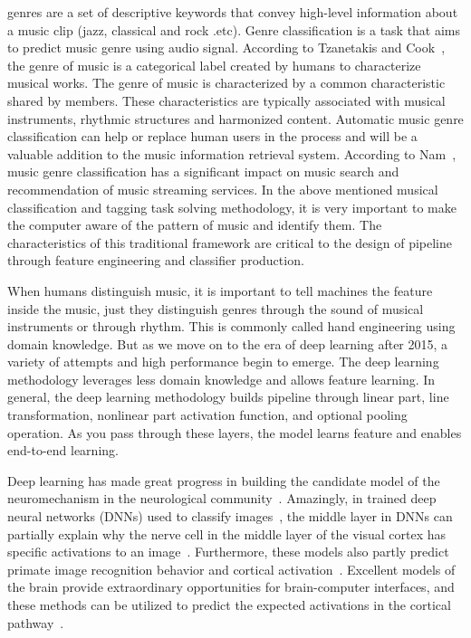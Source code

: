\documentclass[journal]{IEEEtran}
\begin{document}

 genres are a set of descriptive keywords that convey high-level information about a music clip (jazz, classical and rock .etc).
Genre classification is a task that aims to predict music genre using audio signal.
According to Tzanetakis and Cook~\cite{tzanetakis2002musical}, the genre of music is a categorical label created by humans to characterize musical works.
The genre of music is characterized by a common characteristic shared by members.
These characteristics are typically associated with musical instruments, rhythmic structures and harmonized content.
Automatic music genre classification can help or replace human users in the process and will be a valuable addition to the music information retrieval system.
According to Nam~\cite{nam2018deep}, music genre classification has a significant impact on music search and recommendation of music streaming services.
In the above mentioned musical classification and tagging task solving methodology, it is very important to make the computer aware of the pattern of music and identify them.
The characteristics of this traditional framework are critical to the design of pipeline through feature engineering and classifier production.

When humans distinguish music, it is important to tell machines the feature inside the music, just they distinguish genres through the sound of musical instruments or through rhythm.
This is commonly called hand engineering using domain knowledge.
But as we move on to the era of deep learning after 2015, a variety of attempts and high performance begin to emerge.
The deep learning methodology leverages less domain knowledge and allows feature learning.
In general, the deep learning methodology builds pipeline through linear part, line transformation, nonlinear part activation function, and optional pooling operation.
As you pass through these layers, the model learns feature and enables end-to-end learning.


Deep learning has made great progress in building the candidate model of the neuromechanism in the neurological community~\cite{kubilius2019brain-like}. 
Amazingly, in trained deep neural networks (DNNs) used to classify images~\cite{Deng2009ImageNet}, the middle layer in DNNs can partially explain why the nerve cell in the middle layer of the visual cortex has specific activations to an image~\cite{yamins2014performance,khaligh2014deep,gucclu2015deep,murugesan2017brain,cichy2016deep,yamins2016using}. 
Furthermore, these models also partly predict primate image recognition behavior and cortical activation~\cite{rajalingham2018large,kubilius2016deep}.
Excellent models of the brain provide extraordinary opportunities for brain-computer interfaces,
and these methods can be utilized to predict the expected activations in the cortical pathway~\cite{bashivan2019neural}.
\end{document}

